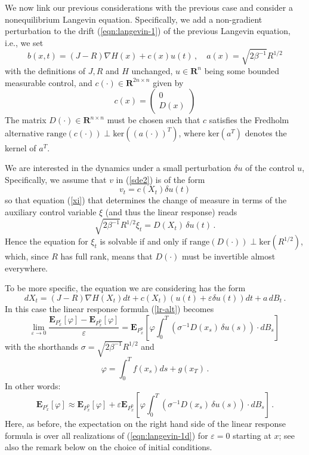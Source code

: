 \documentclass[]{tMPH2e}
\newcommand{\R}{{\mathbf R}}
\newcommand{\eps}{\varepsilon}
\newcommand{\bE}{{\mathbf E}}
\begin{document}
We now link our previous considerations with the previous case and consider a nonequilibrium Langevin equation. Specifically, we add a non-gradient perturbation to the drift (\ref{eqn:langevin-1}) of the previous Langevin equation, i.e., we set 
\begin{equation}\label{eqn:langevin-1b}
b(x,t) = (J-R)\nabla H(x) +  c(x) u(t)\,,\quad a(x) = \sqrt{2\beta^{-1}}R^{1/2}
\end{equation}
with the definitions of $J,R$ and $H$ unchanged, $u\in\R^{n}$ being some bounded measurable control, and $c(\cdot)\in\R^{2n\times n}$ given by 
\[
c(x) = \left( \begin{array}{c}
0 \\ D(x) \end{array}\right)
\]
The matrix $D(\cdot)\in\R^{n\times n}$ must be chosen such that $c$ satisfies the Fredholm alternative $\mathrm{range}(c(\cdot))\perp \mathrm{ker}((a(\cdot))^{T})$, where $\mathrm{ker}(a^T)$ denotes the kernel of $a^T$. 

We are interested in the dynamics under a small perturbation $\delta u$ of the control $u$, Specifically, we assume that $v$ in (\ref{sde2}) is of the form 
\begin{equation}\label{eqn:langevin-1c}
v_{t} = c(X_{t})\delta u(t)
\end{equation}
so that equation (\ref{xi}) that determines the change of measure in terms of the auxiliary control variable $\xi$ (and thus the linear response) reads 
\[
\sqrt{2\beta^{-1}}R^{1/2} \xi_{t} = D(X_{t})\,\delta u(t)\,.
\]
Hence the equation for $\xi_{t}$ is solvable if and only if $\mathrm{range}(D(\cdot))\perp \mathrm{ker}(R^{1/2})$, which, since $R$ has full rank, means that $D(\cdot)$ must be invertible almost everywhere.

To be more specific, the equation we are considering has the form
\begin{equation}\label{eqn:langevin-1d}
dX_t =  (J-R)\nabla H(X_{t})dt + c(X_t)(u(t)+\eps \delta u(t))dt+a\, dB_t\,.
\end{equation}
In this case the linear response formula (\ref{lr-alt})  becomes
\begin{equation}\label{lr-alt2}
\lim_{\eps\to 0}\frac{\bE_{P_{x}^{\eps}}[\varphi] - \bE_{P_{x}^{0}}[\varphi]}{\eps} =  \bE_{P_{x}^{0}}\left[\varphi\int_{0}^{T}(\sigma^{-1}D(x_{s})\,\delta u(s))\cdot dB_{s} \right]\,
\end{equation}
with the shorthands $\sigma=\sqrt{2\beta^{-1}}R^{1/2}$ and 
\[
\varphi = \int_{0}^{T}f(x_{s})ds+g(x_{T})\,.
\]
In other words: 
\begin{equation}\label{eqn:neq-response}
\bE_{P_{x}^{\eps}}[\varphi] \approx \bE_{P_{x}^0}[\varphi] + \eps\bE_{P_{x}^0}\left[\varphi\int_{0}^{T}(\sigma^{-1}D(x_{s})\,\delta u(s))\cdot dB_{s} \right]\,.
\end{equation}
Here, as before, the expectation on the right hand side of the linear response formula is over all realizations of (\ref{eqn:langevin-1d}) for $\eps=0$ starting at $x$; see also the remark below on the choice of initial conditions. 
\end{document}
